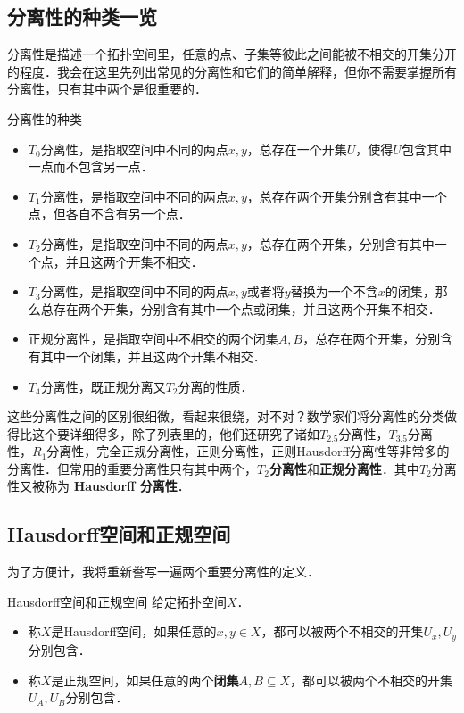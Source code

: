 

\subsection{分离性的种类一览}

分离性是描述一个拓扑空间里，任意的点、子集等彼此之间能被不相交的开集分开的程度．我会在这里先列出常见的分离性和它们的简单解释，但你不需要掌握所有分离性，只有其中两个是很重要的．

\begin{definition}{分离性的种类}
\begin{itemize}

\item $T_0$分离性，是指取空间中不同的两点$x,y$，总存在一个开集$U$，使得$U$包含其中一点而不包含另一点．
\item $T_1$分离性，是指取空间中不同的两点$x,y$，总存在两个开集分别含有其中一个点，但各自不含有另一个点．
\item $T_2$分离性，是指取空间中不同的两点$x,y$，总存在两个开集，分别含有其中一个点，并且这两个开集不相交．
\item $T_3$分离性，是指取空间中不同的两点$x,y$或者将$y$替换为一个不含$x$的闭集，那么总存在两个开集，分别含有其中一个点或闭集，并且这两个开集不相交．
\item 正规分离性，是指取空间中不相交的两个闭集$A, B$，总存在两个开集，分别含有其中一个闭集，并且这两个开集不相交．
\item $T_4$分离性，既正规分离又$T_2$分离的性质．


\end{itemize}
\end{definition}

这些分离性之间的区别很细微，看起来很绕，对不对？数学家们将分离性的分类做得比这个要详细得多，除了列表里的，他们还研究了诸如$T_{2.5}$分离性，$T_{3.5}$分离性，$R_1$分离性，完全正规分离性，正则分离性，正则Hausdorff分离性等非常多的分离性．但常用的重要分离性只有其中两个，\textbf{$T_2$分离性}和\textbf{正规分离性}．其中$T_2$分离性又被称为 \textbf{Hausdorff 分离性}．

\subsection{Hausdorff空间和正规空间}

为了方便计，我将重新誊写一遍两个重要分离性的定义．

\begin{definition}{Hausdorff空间和正规空间}
给定拓扑空间$X$．
\begin{itemize}
\item 称$X$是Hausdorff空间，如果任意的$x,y\in X$，都可以被两个不相交的开集$U_x, U_y$分别包含．
\item 称$X$是正规空间，如果任意的两个\textbf{闭集}$A, B\subseteq X$，都可以被两个不相交的开集$U_A, U_B$分别包含．
\end{itemize}
\end{definition}

